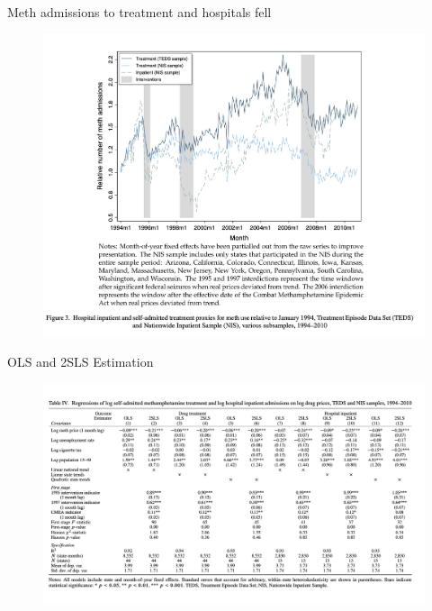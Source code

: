 \documentclass{beamer}
\begin{document}
\begin{frame}{Meth admissions to treatment and hospitals fell}

	\begin{figure}
	\includegraphics[scale=0.35]{./lecture_includes/he_4}
	\end{figure}
\end{frame}


\begin{frame}{OLS and 2SLS Estimation}

	\begin{figure}
	\includegraphics[scale=0.35]{./lecture_includes/he_7}
	\end{figure}
\end{frame}
\end{document}
